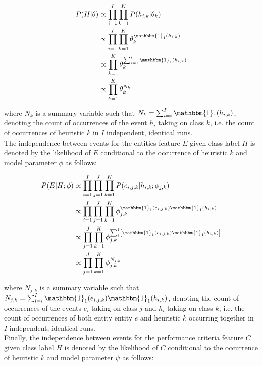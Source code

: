 \begin{equation}
    \begin{split}
        P(H \vert \theta)
        &\propto \prod_{i=1}^{I} \prod_{k=1}^{K} P(h_{i,k} \vert \theta_{k}) \\
        &\propto \prod_{i=1}^{I} \prod_{k=1}^{K} \theta_{k}^{\mathbbm{1}_{1}(h_{i,k})} \\
        &\propto \prod_{k=1}^{K} \theta_{k}^{\sum_{i=1}^{I} \mathbbm{1}_{1}(h_{i,k})} \\
        &\propto \prod_{k=1}^{K} \theta_{k}^{N_{k}}
    \end{split}
\end{equation}

where $N_{k}$ is a summary variable such that $N_{k} = \sum_{i=i}^{I}
\mathbbm{1}_{1}(h_{i,k})$, denoting the count of occurrences of the event
$h_{i}$ taking on class $k$, i.e. the count of occurrences of heuristic $k$ in
$I$ independent, identical runs.\\ The independence between events for the
entities feature $E$ given class label $H$ is denoted by the likelihood of $E$
conditional to the occurrence of heuristic $k$ and model parameter $\phi$ as
follows:

\begin{equation}
    \begin{split}
        P(E \vert H;  \phi)
        &\propto \prod_{i=1}^{I} \prod_{j=1}^{J} \prod_{k=1}^{K} P(e_{i,j,k} \vert h_{i,k} ; \phi_{j,k})  \\
        &\propto \prod_{i=1}^{I} \prod_{j=1}^{J} \prod_{k=1}^{K} \phi_{j,k}^{\mathbbm{1}_{1}(e_{i,j,k})\mathbbm{1}_{1}(h_{i,k})} \\
        &\propto \prod_{j=1}^{J} \prod_{k=1}^{K} \phi_{j,k}^{ \sum_{i}^{I} \left[ \mathbbm{1}_{1}(e_{i,j,k}) \mathbbm{1}_{1}(h_{i,k}) \right]} \\
        &\propto \prod_{j=1}^{J} \prod_{k=1}^{K} \phi_{j,k}^{N_{j,k}}
    \end{split}
\end{equation}

where $N_{j,k}$ is a summary variable such that $N_{j,k} = \sum_{i=i}^{I}
\mathbbm{1}_{1}(e_{i,j,k})\mathbbm{1}_{1}(h_{i,k})$, denoting the count of
occurrences of the events $e_{i}$ taking on class $j$ and $h_{i}$ taking on
class $k$, i.e. the count of occurrences of both entity entity $e$ and heuristic
$k$ occurring together in $I$ independent, identical runs.\\ Finally, the
independence between events for the performance criteria feature $C$ given class
label $H$ is denoted by the likelihood of $C$ conditional to the occurrence of
heuristic $k$ and model parameter $\psi$ as follows:

